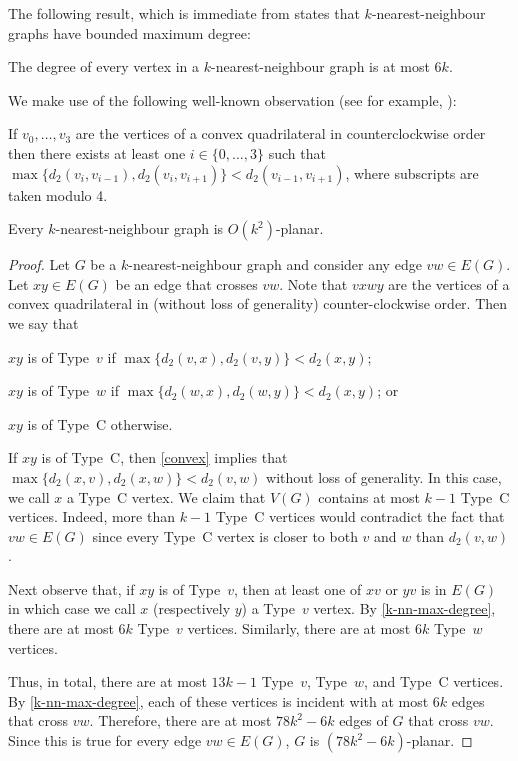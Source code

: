 \documentclass{patmorin}
\begin{document}
The following result, which is immediate from \citet[Corollary~4.2.6]{abrego.munroy.ea:on} states that $k$-nearest-neighbour graphs have bounded maximum degree:
\begin{lem}
\label{k-nn-max-degree}
The degree of every vertex in a $k$-nearest-neighbour graph is at most $6k$.
\end{lem}

We make use of the following well-known observation (see for example, \citet[Lemma~2]{bose.morin.ea:routing}):
\begin{obs}
\label{convex}
If $v_0,\ldots,v_3$ are the vertices of a convex quadrilateral in counterclockwise order then there exists at least one $i\in\{0,\ldots,3\}$ such that $\max\{d_2(v_i,v_{i-1}), d_2(v_i,v_{i+1})\} < d_2(v_{i-1},v_{i+1})$, where subscripts are taken modulo 4.
\end{obs}

\begin{lem}
\label{nearest-neighbour}
  Every $k$-nearest-neighbour graph is $O(k^2)$-planar.
\end{lem}

\begin{proof}
  Let $G$ be a $k$-nearest-neighbour graph and consider any edge $vw\in E(G)$.
  Let $xy\in E(G)$ be an edge that crosses $vw$.  Note that $vxwy$ are the vertices of a convex quadrilateral in (without loss of generality) counter-clockwise order. Then we say that
  \begin{compactenum}
    \item $xy$ is of Type~$v$ if $\max\{d_2(v,x), d_2(v,y)\}< d_2(x,y)$;
    \item $xy$ is of Type~$w$ if $\max\{d_2(w,x), d_2(w,y)\}< d_2(x,y)$; or
    \item $xy$ is of Type~C otherwise.
  \end{compactenum}
  If $xy$ is of Type~C, then \cref{convex} implies that $\max\{d_2(x,v),d_2(x,w)\} < d_2(v,w)$ without loss of generality. 
   In this case, we call $x$ a Type~C vertex.  We claim that $V(G)$ contains at most $k-1$ Type~C vertices.  Indeed, more than $k-1$ Type~C vertices would contradict the fact that $vw\in E(G)$ since every Type~C vertex is closer to both $v$ and $w$ than $d_2(v,w)$.

  Next observe that, if $xy$ is of Type~$v$, then at least one of $xv$ or $yv$ is in $E(G)$ in which case we call $x$ (respectively $y$) a Type~$v$ vertex.  By \cref{k-nn-max-degree}, there are at most $6k$ Type~$v$ vertices.  Similarly, there are at most $6k$ Type~$w$ vertices.

  Thus, in total, there are at most $13k-1$ Type~$v$, Type~$w$, and Type~C vertices. By \cref{k-nn-max-degree}, each of these vertices is incident with at most $6k$ edges that cross $vw$. Therefore, there are at most $78k^2-6k$ edges of $G$ that cross $vw$.  Since this is true for every edge $vw\in E(G)$, $G$ is $(78k^2-6k)$-planar.
\end{proof}
\end{document}
